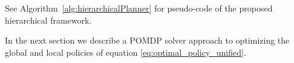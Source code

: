 \documentclass{article}
\newcommand{\ph}[1]{{\textbf{#1}:}} %
\begin{document}



See Algorithm~\ref{alg:hierarchicalPlanner} for pseudo-code of the proposed hierarchical framework.


In the next section we describe a POMDP solver approach to optimizing the global and local policies of equation \ref{eq:optimal_policy_unified}.







\end{document}
